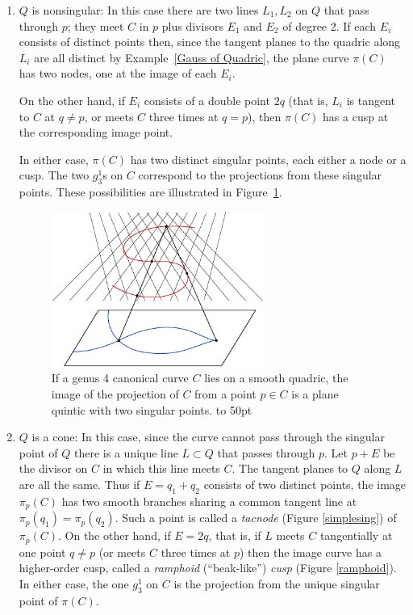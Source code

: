 \begin{enumerate}
\item $Q$ is nonsingular:
In this case there are two lines $L_1, L_2$ on $Q$ that pass through
$p$; they meet $C$ in $p$ plus divisors $E_1$ and $E_2$ of degree 2.
If each $E_i$ consists of distinct points then, since the tangent
planes to the quadric along $L_i$ are all distinct by
Example~\ref{Gauss of Quadric}, the plane curve $\pi(C)$ has two
nodes, one at the image of each $E_i$.

On the other hand, if $E_i$ consists of a double point $2q$ (that is,
$L_i$ is tangent to $C$ at $q\neq p$, or meets $C$ three times at
$q=p$), then $\pi(C)$ has a cusp at the corresponding image point.

In either case, $\pi(C)$ has two distinct singular points, each either a
node or a cusp. The two $g^1_3$s on $C$ correspond to the
projections from these singular points. These possibilities are
illustrated in Figure~\ref{Fig8.2A}.

\begin{figure}[b]
\centerline {\includegraphics[height=2in]{main/canonical-projected-2}}
\caption{If a genus 4 canonical curve $C$ lies on a smooth quadric, the image of the projection of $C$ from a point $p\in C$
is a
plane quintic
%
with two singular points.
\hbox to 50pt{} %
}
\label{Fig8.2A}
\end{figure}

\item $Q$ is a
cone:
%
In this case, since the curve cannot pass through the singular point
of $Q$ there is a unique line $L\subset Q$ that passes through $p$.
Let $p+E$ be the divisor on $C$ in which this line meets $C$. The
tangent planes to $Q$ along $L$ are all the same. Thus if
$E = q_1+q_2$ consists of two distinct points,
the image $\pi_p(C)$ has two smooth branches sharing a common tangent line at
$\pi_p(q_1) = \pi_p(q_2)$. Such a point is called a \emph{tacnode}
(Figure \ref{simplesing})
%
of $\pi_p(C)$. On the other hand, if $E= 2q$, that is, if $L$ meets $C$
tangentially at one point $q\neq p$ (or meets $C$ three times at $p$) then
the image curve has a higher-order cusp, called a \emph{ramphoid}
(``beak-like'')
\emph{cusp}
(Figure \ref{ramphoid}).
%
%
In either case, the one $g^1_3$ on $C$ is the projection from the
unique singular point of $\pi(C)$.
\end{enumerate}

